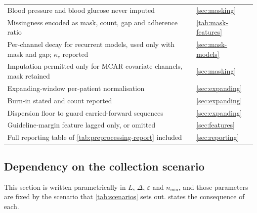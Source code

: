 \documentclass[12pt,a4paper,oneside]{report}
\begin{document}
\begin{table}[htbp]
\begin{tabularx}{\textwidth}{@{}X >{\raggedright\arraybackslash}p{5.2cm}@{}}
Blood pressure and blood glucose never imputed & \cref{sec:masking} \\
Missingness encoded as mask, count, gap and adherence ratio & \cref{tab:mask-features} \\
Per-channel decay for recurrent models, used only with mask and gap; $\kappa_c$ reported & \cref{sec:mask-models} \\
Imputation permitted only for MCAR covariate channels, mask retained & \cref{sec:masking} \\
Expanding-window per-patient normalisation & \cref{sec:expanding} \\
Burn-in stated and count reported & \cref{sec:expanding} \\
Dispersion floor to guard carried-forward sequences & \cref{sec:expanding} \\
Guideline-margin feature lagged only, or omitted & \cref{sec:features} \\
Full reporting table of \cref{tab:preprocessing-report} included & \cref{sec:reporting} \\
\bottomrule
\end{tabularx}
\end{table}

\subsection{Dependency on the collection scenario}\label{sec:scenario-dependency}

This section is written parametrically in $L$, $\Delta$, $\varepsilon$ and $n_{\min}$, and those parameters are fixed by the scenario that \cref{tab:scenarios} sets out.  states the consequence of each.
\end{document}
